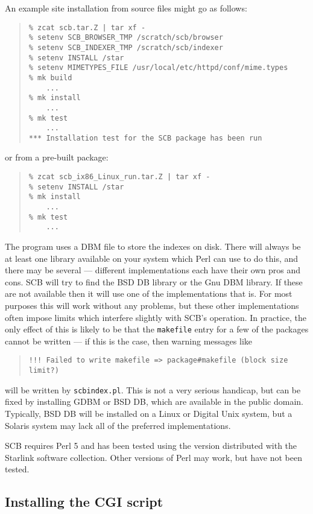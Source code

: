 \documentclass[twoside,11pt]{article}
\newcommand{\xlabel}[1]{}
\renewcommand{\_}{\texttt{\symbol{95}}}
\begin{document}
An example site installation from source files might go as follows:
\begin{quote}
\begin{verbatim}
% zcat scb.tar.Z | tar xf -
% setenv SCB_BROWSER_TMP /scratch/scb/browser
% setenv SCB_INDEXER_TMP /scratch/scb/indexer
% setenv INSTALL /star
% setenv MIMETYPES_FILE /usr/local/etc/httpd/conf/mime.types
% mk build
    ...
% mk install
    ...
% mk test
    ...
*** Installation test for the SCB package has been run
\end{verbatim}
\end{quote}
or from a pre-built package:
\begin{quote}
\begin{verbatim}
% zcat scb_ix86_Linux_run.tar.Z | tar xf -
% setenv INSTALL /star
% mk install
    ...
% mk test
    ...
\end{verbatim}
\end{quote}

The program uses a DBM file to store the indexes on disk.
There will always be at least one library available on your system
which Perl can use to do this, and there may be 
several --- different implementations each have their own pros and cons.  
SCB will try to find 
the BSD DB library or the Gnu DBM library.
If these are not available then it will use one of the implementations
that is.  For most purposes this will work without any problems, but
these other implementations often impose limits which interfere slightly
with SCB's operation. 
In practice, the only effect of this is likely to be that the 
{\tt makefile} entry for a few of the packages cannot be written ---
if this is the case, then warning messages like 
\begin{quote}
\begin{verbatim}
!!! Failed to write makefile => package#makefile (block size limit?)
\end{verbatim}
\end{quote}
will be written by {\tt scbindex.pl}.
This is not a very serious handicap, but can be fixed by 
installing GDBM or BSD DB, which are available in the public domain.
Typically, BSD DB will be installed on a Linux or Digital Unix system,
but a Solaris system may lack all of the preferred implementations. 


SCB requires Perl 5
and has been tested using the version distributed with the 
Starlink software collection. 
Other versions of Perl may work, but have not been tested.


\subsection{\xlabel{sec:install-cgi}\label{sec:install-cgi}Installing the CGI script}
\end{document}
